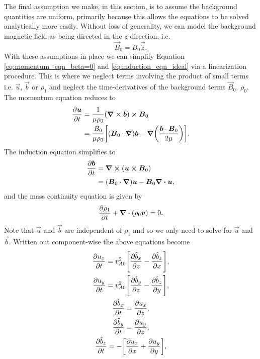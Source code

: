 The final assumption we make, in this section, is to assume the background quantities are uniform, primarily because this allows the equations to be solved analytically more easily. Without loss of generality, we can model the background magnetic field as being directed in the $z$-direction, i.e.
\begin{equation}
    \label{eq:background_field}
    \vec{B}_0=B_0\vec{\hat{z}}.
\end{equation}
With these assumptions in place we can simplify Equation \eqref{eq:momentum_eqn_beta=0} and \eqref{eq:induction_eqn_ideal} via a linearization procedure. This is where we neglect terms involving the product of small terms i.e. $\vec{u}$, $\vec{b}$ or $\rho_1$ and neglect the time-derivatives of the background terms $\vec{B}_0$, $\rho_0$. The momentum equation reduces to
\begin{equation}
    \label{eq:momentum_eqn_linear}
    \begin{aligned}
        \pdv{\boldsymbol{u}}{t}&=\frac{1}{\mu\rho_0}(\curl{\boldsymbol{b}})\cross\boldsymbol{B}_0 \\
        &=\frac{B_0}{\mu\rho_0}\qty[(\boldsymbol{B}_0\cdot\grad)\boldsymbol{b} - \grad\qty(\frac{\boldsymbol{b}\cdot\boldsymbol{B}_0}{2\mu})].
    \end{aligned}
\end{equation}
The induction equation simplifies to
\begin{equation}
    \begin{aligned}
    \pdv{\boldsymbol{b}}{t}&=\curl(\boldsymbol{u}\cross\boldsymbol{B}_0) \\
    &=(\boldsymbol{B}_0\cdot\grad)\boldsymbol{u} - \boldsymbol{B}_0\div{\boldsymbol{u}},
    \end{aligned}
\end{equation}
and the mass continuity equation is given by
\begin{equation}
    \pdv{\rho_1}{t}+\div(\rho_0\boldsymbol{v})=0.
\end{equation}
Note that $\vec{u}$ and $\vec{b}$ are independent of $\rho_1$ and so we only need to solve for $\vec{u}$ and $\vec{b}$.
Written out component-wise the above equations become
\begin{gather}
    \pdv{u_x}{t} = v_{A0}^2\qty[\pdv{\hat{b}_x}{z} - \pdv{\hat{b}_z}{x}],\\
    \label{eq:uy_eqn_linear}
    \pdv{u_y}{t} = v_{A0}^2\qty[\pdv{\hat{b}_y}{z} - \pdv{\hat{b}_z}{y}],\\
    \label{eq:bx_eqn_linear}
    \pdv{\hat{b}_x}{t} = \pdv{u_x}{z},\\
    \label{eq:by_eqn_linear}
    \pdv{\hat{b}_y}{t} = \pdv{u_y}{z},\\
    \pdv{\hat{b}_z}{t} = -\qty[\pdv{u_x}{x} + \pdv{u_y}{y}],
\end{gather}
